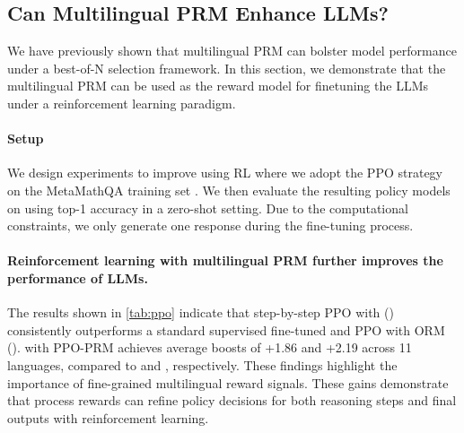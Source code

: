 \subsection{Can Multilingual PRM Enhance LLMs?}
\label{sec:analysis_ppo}


We have previously shown that multilingual PRM can bolster model performance under a best-of-N selection framework. In this section, we demonstrate that the multilingual PRM can be used as the reward model for finetuning the LLMs under a reinforcement learning paradigm.

\paragraph{Setup}
We design experiments to improve \llama using RL where we adopt the PPO strategy \citep{ppo} on the MetaMathQA training set \citep{metamath}. We then evaluate the resulting policy models on \mgsmset using top-1 accuracy in a zero-shot setting. Due to the computational constraints, we only generate one response during the fine-tuning process.

\paragraph{Reinforcement learning with multilingual PRM further improves the performance of LLMs.}

The results shown in \autoref{tab:ppo} indicate that step-by-step PPO with \mix () consistently outperforms a standard supervised fine-tuned  and PPO with ORM (). \llama with PPO-PRM achieves average boosts of +1.86 and +2.19 across 11 languages, compared to  and , respectively. These findings highlight the importance of fine-grained multilingual reward signals. These gains demonstrate that process rewards can refine policy decisions for both reasoning steps and final outputs with reinforcement learning.
